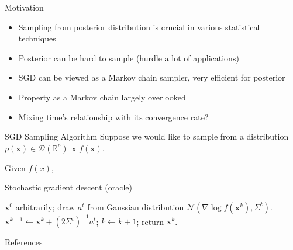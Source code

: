 \documentclass[final]{beamer}
\newlength{\onecolwid}
\newcommand{\bx}{\mathbf{x}}
\newcommand{\R}{\mathbb{R}}
\newcommand{\D}{\mathscr{D}}
\newcommand{\N}{\mathscr{N}}
\begin{document}
\begin{frame}[t]
\begin{columns}[t]
\begin{column}{\onecolwid}
\begin{block}{Motivation}
\begin{itemize}
\item Sampling from posterior distribution is crucial in various statistical techniques
\item Posterior can be hard to sample  (hurdle a lot of applications)
\item SGD can be viewed as a Markov chain sampler, very efficient for posterior
\item Property as a Markov chain largely overlooked
\item Mixing time's relationship with its convergence rate?
\end{itemize}

\end{block}

%

\begin{block}{SGD Sampling Algorithm}
Suppose we would like to sample from a distribution $p(\bx)\in \D(\R^p) \propto f(\bx)$.
\begin{algorithm}[H]
{\small
Given $f(x)$,
\begin{algorithmic}\caption{Stochastic gradient descent (oracle)}\label{Alg:SGD}
 $ \bx^0$ arbitrarily;
\STATE draw $a^t$ from Gaussian distribution $\N(\nabla \log f(\bx^k), \Sigma^{t})$.
\STATE
$\bx^{k+1} \gets \bx^k + (2\Sigma^t)^{-1} a^t$;
\STATE $k\gets k+1$;
\ENDWHILE
\STATE return $\bx^k$.
\end{algorithmic}}
\end{algorithm}


\end{block}


\begin{block}{References}

\nocite{*} %
\small{
\vspace{0.75in}}

\end{block}


\end{column}
\end{columns}
\end{frame}
\end{document}
